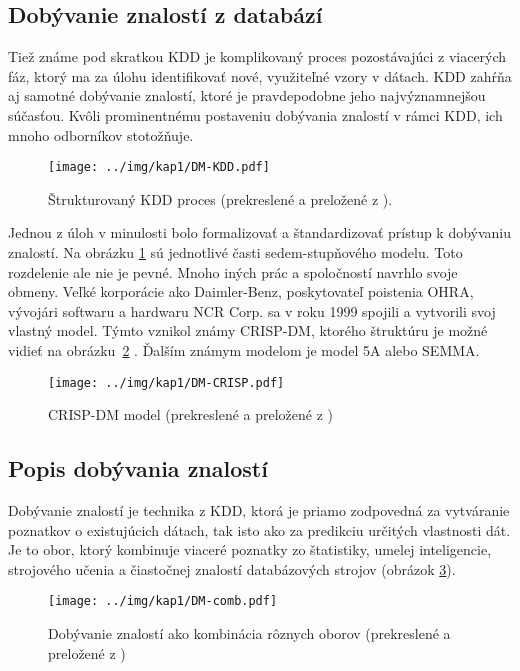 \subsection{Dobývanie znalostí z databází}\label{kap1:2.2:2.2.1:KDD}
Tiež známe pod skratkou KDD je komplikovaný proces pozostávajúci z viacerých fáz, ktorý ma za úlohu identifikovať nové, využiteľné vzory v dátach. KDD zahŕňa aj samotné dobývanie znalostí, ktoré je pravdepodobne jeho najvýznamnejšou súčasťou. Kvôli prominentnému postaveniu dobývania znalostí v rámci KDD, ich mnoho odborníkov stotožňuje.

\begin{figure}[h]
\centering
\centerline{\mbox{\texttt{[image: ../img/kap1/DM-KDD.pdf]}}}
\caption{Štrukturovaný KDD proces (prekreslené a preložené z \cite{kap1-DataMiningForTrees}).}\label{fig:dataMineKDD}
\end{figure}

Jednou z úloh v minulosti bolo formalizovať a štandardizovať prístup k dobývaniu znalostí. Na obrázku \ref{fig:dataMineKDD} sú jednotlivé časti sedem-stupňového modelu. Toto rozdelenie ale nie je pevné. Mnoho iných prác a spoločností navrhlo svoje obmeny. Veľké korporácie ako Daimler-Benz, poskytovateľ poistenia OHRA, vývojári softwaru a hardwaru NCR Corp. sa v roku 1999 spojili a vytvorili svoj vlastný model. Týmto vznikol známy CRISP-DM, ktorého štruktúru je možné vidieť na obrázku~\ref{fig:dataMineCRISP} \cite{kap1-DataMiningForMasses}. Ďalším známym modelom je model 5A alebo SEMMA.

\begin{figure}[h]
\centering
\centerline{\mbox{\texttt{[image: ../img/kap1/DM-CRISP.pdf]}}}
\caption{CRISP-DM model (prekreslené a preložené z \cite{kap1-DataMiningForMasses})}\label{fig:dataMineCRISP}
\end{figure}

\subsection{Popis dobývania znalostí}\label{kap1:2.2:2.2.2:DataMineProcess}
Dobývanie znalostí je technika z KDD, ktorá je priamo zodpovedná za vytváranie poznatkov o existujúcich dátach, tak isto ako za predikciu určitých vlastnosti dát. Je to obor, ktorý kombinuje viaceré poznatky zo štatistiky, umelej inteligencie, strojového učenia a čiastočnej znalostí databázových strojov (obrázok \ref{fig:dataMineComb}).

\begin{figure}[h]
\centering
\centerline{\mbox{\texttt{[image: ../img/kap1/DM-comb.pdf]}}}
\caption{Dobývanie znalostí ako kombinácia rôznych oborov (prekreslené a preložené z \cite{online-DataMining})}\label{fig:dataMineComb}
\end{figure}

